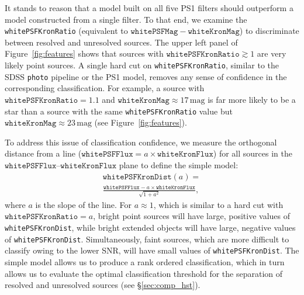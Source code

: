 \documentclass[twocolumn]{aastex62}
\begin{document}
\begin{CJK*}{UTF8}{gbsn}
It stands to reason that a model built on all five PS1 filters should
outperform a model constructed from a single filter. To that end, we examine
the \texttt{whitePSFKronRatio} (equivalent to $\mathtt{whitePSFMag} -
\mathtt{whiteKronMag}$) to discriminate between resolved and unresolved
sources. The upper left panel of Figure~\ref{fig:features} shows that
sources with $\mathtt{whitePSFKronRatio} \gtrsim 1$ are very likely point sources. A single hard cut on \texttt{whitePSFKronRatio}, similar to the SDSS
\texttt{photo} pipeline or the PS1 model, removes any sense of confidence in
the corresponding classification. For example, a source with
$\mathtt{whitePSFKronRatio} = 1.1$ and $\mathtt{whiteKronMag} \approx
17\,\mathrm{mag}$ is far more likely to be a star than a source with the
same \texttt{whitePSFKronRatio} value but $\mathtt{whiteKronMag} \approx
23\,\mathrm{mag}$ (see Figure~\ref{fig:features}).

To address this issue of classification confidence, we measure the
orthogonal distance from a line ($\mathtt{whitePSFFlux} = a\times
\mathtt{whiteKronFlux}$) for all sources in the
$\mathtt{whitePSFFlux}$--$\mathtt{whiteKronFlux}$ plane to define the simple model:
%
\begin{multline}
 \mathtt{whitePSFKronDist}(a) = \\
 \frac{\mathtt{whitePSFFlux} - a\times\mathtt{whiteKronFlux}}{ \sqrt{1 + a^2}},
 \label{eqn:psfkrondist}
\end{multline}
%
where $a$ is the slope of the line. For $a \approx 1$, which is similar to a
hard cut with $\mathtt{whitePSFKronRatio} = a$, bright point sources will
have large, positive values of \texttt{whitePSFKronDist}, while bright
extended objects will have large, negative values of
\texttt{whitePSFKronDist}. Simultaneously, faint sources, which are more
difficult to classify owing to the lower SNR, will have small values of
\texttt{whitePSFKronDist}. The simple model allows us to produce a rank
ordered classification, which in turn allows us to evaluate the optimal
classification threshold for the separation of resolved and unresolved 
sources (see \S\ref{sec:comp_hst}).


\end{CJK*}
\end{document}
